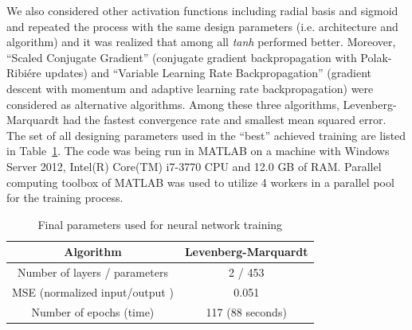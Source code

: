 \documentclass[twocolumn,10pt]{asme2e}
\begin{document}
We also considered other activation functions including radial basis and sigmoid and repeated the process with the same design parameters (i.e. architecture and algorithm) and it was realized that among all \textit{tanh} performed better. Moreover, ``Scaled Conjugate Gradient'' (conjugate gradient backpropagation with Polak-Ribiére updates) \cite{moller1993scaled} and ``Variable Learning Rate Backpropagation'' (gradient descent with momentum and adaptive learning rate backpropagation) were considered as alternative algorithms. Among these three algorithms, Levenberg-Marquardt had the fastest convergence rate and smallest mean squared error. The set of all designing parameters used in the ``best'' achieved training are listed in Table~\ref{tab:param}. The code was being run in MATLAB on a machine with Windows Server 2012, Intel(R) Core(TM) i7-3770 CPU and 12.0 GB of RAM. Parallel computing toolbox of MATLAB was used to utilize 4 workers in a parallel pool for the training process.

\begin{table}[t]
	\centering

	\caption{Final parameters used for neural network training}
\begin{tabular}{c|c}	
	\hline
	\hline Algorithm & Levenberg-Marquardt \\ 
	\hline Number of layers / parameters & 2 / 453 \\ 
	\hline MSE (normalized input/output ) & 0.051 \\ 
	\hline Number of epochs (time) & 117 (88 seconds) \\ 
	\hline  	 
\end{tabular} \label{tab:param}
\end{table}
\end{document}

